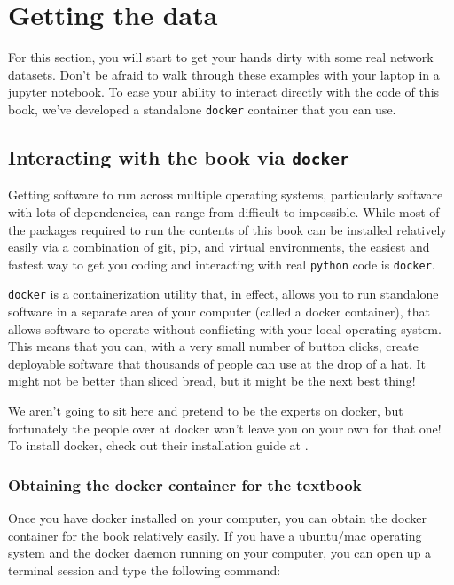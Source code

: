 \section{Getting the data}
\label{sec:ch2:getdata}

For this section, you will start to get your hands dirty with some real network datasets. Don't be afraid to walk through these examples with your laptop in a jupyter notebook. To ease your ability to interact directly with the code of this book, we've developed a standalone \texttt{docker} container that you can use. 

\subsection{Interacting with the book via \texttt{docker}}

Getting software to run across multiple operating systems, particularly software with lots of dependencies, can range from difficult to impossible. While most of the packages required to run the contents of this book can be installed relatively easily via a combination of git, pip, and virtual environments, the easiest and fastest way to get you coding and interacting with real \texttt{python} code is \texttt{docker}. 

\texttt{docker} is a containerization utility that, in effect, allows you to run standalone software in a separate area of your computer (called a {docker container}), that allows software to operate without conflicting with your local operating system. This means that you can, with a very small number of button clicks, create deployable software that thousands of people can use at the drop of a hat. It might not be better than sliced bread, but it might be the next best thing! 

We aren't going to sit here and pretend to be the experts on docker, but fortunately the people over at docker won't leave you on your own for that one! To install docker, check out their installation guide at \cite{dockerinstall}. 

\subsubsection{Obtaining the docker container for the textbook}

Once you have docker installed on your computer, you can obtain the docker container for the book relatively easily. If you have a ubuntu/mac operating system and the docker daemon running on your computer, you can open up a terminal session and type the following command:


